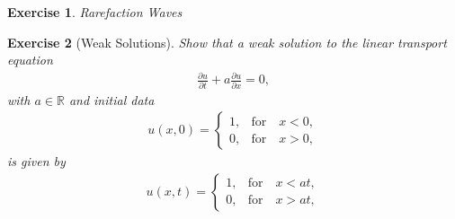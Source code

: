 \documentclass[10pt,letterpaper]{article}
\theoremstyle{break}
\newtheorem{exercise}{Exercise}
\begin{document}
\begin{exercise}{Rarefaction Waves}
\end{exercise}

\begin{solution}
    
\end{solution}



\begin{exercise}[Weak Solutions]
    Show that a weak solution to the linear transport equation 
    \begin{gather*}
    	\frac{\partial u}{\partial t} 
    	+ 
    	a 
    	\frac{\partial u}{\partial x}  = 0, 
    \end{gather*}
    with $a\in \mathbb{R}$ and initial data 
    \begin{align}
    	u(x,0) = 
    	\left\{
    	\begin{array}{ll}
    	1, & \text{for} \quad x<0,\\
    	0, &\text{for} \quad x > 0,
    	\end{array}
    	\right.
    \end{align}
    is given by
    \begin{align} 
    	u(x,t) = 
    	\left\{
    	\begin{array}{ll}
    	1, & \text{for} \quad x<at,\\
    	0, & \text{for} \quad x > at,
    	\end{array}
    	\right.
    \end{align}
\end{exercise}
\end{document}
